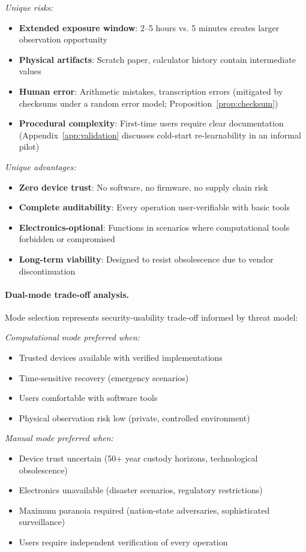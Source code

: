 \documentclass[11pt]{article}
\begin{document}
\textit{Unique risks:}
\begin{itemize}[noitemsep]
    \item \textbf{Extended exposure window}: 2--5 hours vs. 5 minutes creates larger observation opportunity
    \item \textbf{Physical artifacts}: Scratch paper, calculator history contain intermediate values
    \item \textbf{Human error}: Arithmetic mistakes, transcription errors (mitigated by checksums under a random error model; Proposition~\ref{prop:checksum})
    \item \textbf{Procedural complexity}: First-time users require clear documentation (Appendix~\ref{app:validation} discusses cold-start re-learnability in an informal pilot)
\end{itemize}

\textit{Unique advantages:}
\begin{itemize}[noitemsep]
    \item \textbf{Zero device trust}: No software, no firmware, no supply chain risk
    \item \textbf{Complete auditability}: Every operation user-verifiable with basic tools
    \item \textbf{Electronics-optional}: Functions in scenarios where computational tools forbidden or compromised
    \item \textbf{Long-term viability}: Designed to resist obsolescence due to vendor discontinuation
\end{itemize}

\paragraph{Dual-mode trade-off analysis.} Mode selection represents security-usability trade-off informed by threat model:

\textit{Computational mode preferred when:}
\begin{itemize}[noitemsep]
    \item Trusted devices available with verified implementations
    \item Time-sensitive recovery (emergency scenarios)
    \item Users comfortable with software tools
    \item Physical observation risk low (private, controlled environment)
\end{itemize}

\textit{Manual mode preferred when:}
\begin{itemize}[noitemsep]
    \item Device trust uncertain (50+ year custody horizons, technological obsolescence)
    \item Electronics unavailable (disaster scenarios, regulatory restrictions)
    \item Maximum paranoia required (nation-state adversaries, sophisticated surveillance)
    \item Users require independent verification of every operation
\end{itemize}
\end{document}
